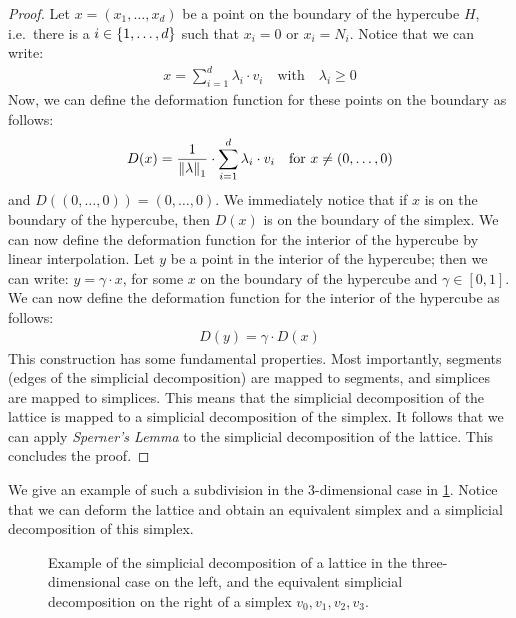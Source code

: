 \begin{proof}
	Let $x = (x_1, \dots, x_d)$ be a point on the boundary of the hypercube $H$, i.e.\ there is a $i \in \left\{1, \dots, d\right\}$ such that $x_i = 0$ or $x_i = N_i$. Notice that we can write:
	\begin{align*}
		x = \sum_{i=1}^{d} \lambda_i \cdot v_i \quad \text{with} \quad \lambda_i \geq 0
	\end{align*}
	Now, we can define the deformation function for these points on the boundary as follows:
	\begin{align*}
		D(x) = \frac{1}{\left\lVert\lambda\right\rVert_1} \cdot \sum_{i=1}^{d} \lambda_i \cdot v_i \quad \text{for $x \neq (0, \dots, 0)$}
	\end{align*}
    and $D((0, \dots, 0)) = (0, \dots, 0)$. We immediately notice that if $x$ is on the boundary of the hypercube, then $D(x)$ is on the boundary of the simplex. We can now define the deformation function for the interior of the hypercube by linear interpolation. Let $y$ be a point in the interior of the hypercube; then we can write: $y = \gamma \cdot x$, for some $x$ on the boundary of the hypercube and $\gamma \in [0, 1]$. We can now define the deformation function for the interior of the hypercube as follows:
	\begin{align*}
		D(y) = \gamma \cdot D(x)
	\end{align*}
	This construction has some fundamental properties. Most importantly, segments (edges of the simplicial decomposition) are mapped to segments, and simplices are mapped to simplices. This means that the simplicial decomposition of the lattice is mapped to a simplicial decomposition of the simplex. It follows that we can apply \textit{Sperner's Lemma} to the simplicial decomposition of the lattice. This concludes the proof.
\end{proof}

We give an example of such a subdivision in the 3-dimensional case in \cref{fig:sperner_lattice_example}. Notice that we can deform the lattice and obtain an equivalent simplex and a simplicial decomposition of this simplex.

\begin{figure}
	\centering
	\caption[Example of a simplicial decomposition of a lattice]{Example of the simplicial decomposition of a lattice in the three-dimensional case on the left, and the equivalent simplicial decomposition on the right of a simplex $v_0, v_1, v_2, v_3$.}
	\label{fig:sperner_lattice_example}
\end{figure}

